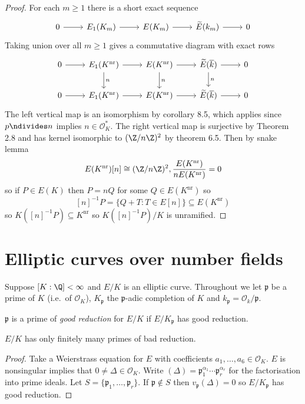 \documentclass[a4paper]{article}
\theoremstyle{definition}
\theoremstyle{theorem}
\renewcommand*{\O}{\mathcal{O}}
\begin{document}
\begin{proof}
  For each \(m \geq 1\) there is a short exact sequence
  \[
    \begin{tikzcd}
      0 \ar[r] & E_1(K_m) \ar[r] & E(K_m) \ar[r] & \widetilde E(k_m) \ar[r] & 0
    \end{tikzcd}
  \]
  Taking union over all \(m \geq 1\) gives a commutative diagram with exact rows
  \[
    \begin{tikzcd}
      0 \ar[r] & E_1(K^{\mathrm{nr}}) \ar[d, "n"] \ar[r] & E(K^{\mathrm{nr}}) \ar[r] \ar[d, "n"] & \widetilde E(\overline k) \ar[r] \ar[d, "n"] & 0 \\
      0 \ar[r] & E_1(K^{\mathrm{nr}}) \ar[r] & E(K^{\mathrm{nr}}) \ar[r] & \widetilde E(\overline k) \ar[r] & 0
    \end{tikzcd}
  \]
  The left vertical map is an isomorphism by corollary 8.5, which applies since \(p \ndivides n\) implies \(n \in \O_K^*\). The right vertical map is surjective by Theorem 2.8 and has kernel isomorphic to \((\Z/n\Z)^2\) by theorem 6.5. Then by snake lemma
  \[
    E(K^{\mathrm{nr}})[n] \cong (\Z/n\Z)^2, \frac{E(K^{\mathrm{nr}})}{n E(K^{\mathrm{nr}})} = 0
  \]
  so if \(P \in E(K)\) then \(P = nQ\) for some \(Q \in E(K^{\mathrm{nr}})\) so
  \[
    [n]^{-1} P = \{Q + T: T \in E[n]\} \subseteq E(K^{\mathrm{nr}})
  \]
  so \(K([n]^{-1} P) \subseteq K^{\mathrm{nr}}\) so \(K([n]^{-1}P)/K\) is unramified.
\end{proof}

\section{Elliptic curves over number fields}

Suppose \([K: \Q] < \infty\) and \(E/K\) is an elliptic curve. Throughout we let \(\mathfrak p\) be a prime of \(K\) (i.e.\ of \(\O_K\)), \(K_{\mathfrak p}\) the \(\mathfrak p\)-adic completion of \(K\) and \(k_{\mathfrak p} = \O_k/\mathfrak p\).

\begin{definition}
  \(\mathfrak p\) is a prime of \emph{good reduction} for \(E/K\) if \(E/K_{\mathfrak p}\) has good reduction.
\end{definition}

\begin{lemma}
  \(E/K\) has only finitely many primes of bad reduction.
\end{lemma}

\begin{proof}
  Take a Weierstrass equation for \(E\) with coefficients \(a_1, \dots, a_6 \in \O_K\). \(E\) is nonsingular implies that \(0 \neq \Delta \in \O_K\). Write \((\Delta) = \mathfrak p_1^{\alpha_1} \cdots \mathfrak p_r^{\alpha_r}\) for the factorisation into prime ideals. Let \(S = \{\mathfrak p_1, \dots, \mathfrak p_r\}\). If \(\mathfrak p \notin S\) then \(v_{\mathfrak p}(\Delta) = 0\) so \(E/K_{\mathfrak p}\) has good reduction.
\end{proof}
\end{document}
